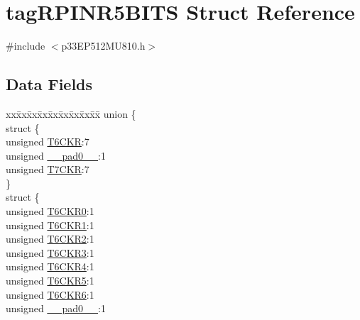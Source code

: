 \hypertarget{structtag_r_p_i_n_r5_b_i_t_s}{}\section{tag\+R\+P\+I\+N\+R5\+B\+I\+TS Struct Reference}
\label{structtag_r_p_i_n_r5_b_i_t_s}


{\ttfamily \#include $<$p33\+E\+P512\+M\+U810.\+h$>$}

\subsection*{Data Fields}
\begin{DoxyCompactItemize}
\item 
\begin{tabbing}
xx\=xx\=xx\=xx\=xx\=xx\=xx\=xx\=xx\=\kill
union \{\\
\>struct \{\\
\>\>unsigned \hyperlink{structtag_r_p_i_n_r5_b_i_t_s_af0524cf4aaf57a7ba62b56178b6fc6a8}{T6CKR}:7\\
\>\>unsigned \hyperlink{structtag_r_p_i_n_r5_b_i_t_s_adf71f3d8410c1f1dbbc96680a92c49af}{\_\_pad0\_\_}:1\\
\>\>unsigned \hyperlink{structtag_r_p_i_n_r5_b_i_t_s_aaf0f957df6e370d75307a51b17f941b3}{T7CKR}:7\\
\>\} \\
\>struct \{\\
\>\>unsigned \hyperlink{structtag_r_p_i_n_r5_b_i_t_s_a661825d2100a49e5c8dedb2f3979f8e8}{T6CKR0}:1\\
\>\>unsigned \hyperlink{structtag_r_p_i_n_r5_b_i_t_s_ae38493dbb147a414351b6d2bcf71580d}{T6CKR1}:1\\
\>\>unsigned \hyperlink{structtag_r_p_i_n_r5_b_i_t_s_a2184b9129d56985296b34bd9a229ebbd}{T6CKR2}:1\\
\>\>unsigned \hyperlink{structtag_r_p_i_n_r5_b_i_t_s_aa3ea4d8f32e46089e4f890326e00c78e}{T6CKR3}:1\\
\>\>unsigned \hyperlink{structtag_r_p_i_n_r5_b_i_t_s_a80b0a752e159d6315bdf5a936b7830b2}{T6CKR4}:1\\
\>\>unsigned \hyperlink{structtag_r_p_i_n_r5_b_i_t_s_af4e51d172247f0f6b20b7e0dbc6f6eeb}{T6CKR5}:1\\
\>\>unsigned \hyperlink{structtag_r_p_i_n_r5_b_i_t_s_af3569c7c867daf4ae9696b1754675b12}{T6CKR6}:1\\
\>\>unsigned \hyperlink{structtag_r_p_i_n_r5_b_i_t_s_adf71f3d8410c1f1dbbc96680a92c49af}{\_\_pad0\_\_}:1\\

\end{tabbing}
\end{DoxyCompactItemize}
